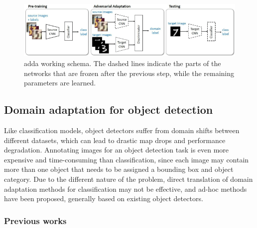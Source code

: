 \documentclass[%
    corpo=12pt,
    twoside,
    stile=classica,   
    tipotesi=magistrale,
    evenboxes,
    english
]{toptesi}
\begin{document}
\begin{figure}[ht!]
	\centering
	\includegraphics[width=0.9\linewidth]{imgs/adda.png}
	\caption{\acrshort{adda} working schema\cite{tzeng2017adversarial}. The dashed lines indicate the parts of the networks that are frozen after the previous step, while the remaining parameters are learned.}
	\label{fig:adda}
\end{figure}

\subsection{Domain adaptation for object detection}
Like classification models, object detectors suffer from domain shifts between different datasets, which can lead to drastic \gls{map} drops and performance degradation. Annotating images for an object detection task is even more expensive and time-consuming than classification, since each image may contain more than one object that needs to be assigned a bounding box and object category. Due to the different nature of the problem, direct translation of domain adaptation methods for classification may not be effective, and ad-hoc methods have been proposed, generally based on existing object detectors.

\subsubsection{Previous works}
\end{document}
